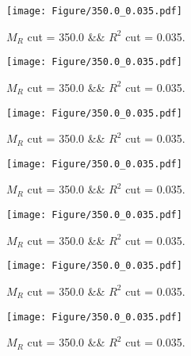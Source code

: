  
\begin{figure}[H] 
\begin{center} 
\texttt{[image: Figure/350.0\_0.035.pdf]} 
\caption{$M_R$ cut = 350.0 \&\& $R^2$ cut = 0.035.} 
\label{Fig:350.0_0.035} 
\end{center} 
\end{figure} 
 
 
\begin{figure}[H] 
\begin{center} 
\texttt{[image: Figure/350.0\_0.035.pdf]} 
\caption{$M_R$ cut = 350.0 \&\& $R^2$ cut = 0.035.} 
\label{Fig:350.0_0.035} 
\end{center} 
\end{figure} 
 
 
\begin{figure}[H] 
\begin{center} 
\texttt{[image: Figure/350.0\_0.035.pdf]} 
\caption{$M_R$ cut = 350.0 \&\& $R^2$ cut = 0.035.} 
\label{Fig:350.0_0.035} 
\end{center} 
\end{figure} 
 
 
\begin{figure}[H] 
\begin{center} 
\texttt{[image: Figure/350.0\_0.035.pdf]} 
\caption{$M_R$ cut = 350.0 \&\& $R^2$ cut = 0.035.} 
\label{Fig:350.0_0.035} 
\end{center} 
\end{figure} 
 
 
\begin{figure}[H] 
\begin{center} 
\texttt{[image: Figure/350.0\_0.035.pdf]} 
\caption{$M_R$ cut = 350.0 \&\& $R^2$ cut = 0.035.} 
\label{Fig:350.0_0.035} 
\end{center} 
\end{figure} 
 
 
\begin{figure}[H] 
\begin{center} 
\texttt{[image: Figure/350.0\_0.035.pdf]} 
\caption{$M_R$ cut = 350.0 \&\& $R^2$ cut = 0.035.} 
\label{Fig:350.0_0.035} 
\end{center} 
\end{figure} 
 
 
\begin{figure}[H] 
\begin{center} 
\texttt{[image: Figure/350.0\_0.035.pdf]} 
\caption{$M_R$ cut = 350.0 \&\& $R^2$ cut = 0.035.} 
\label{Fig:350.0_0.035} 
\end{center} 
\end{figure} 
 
